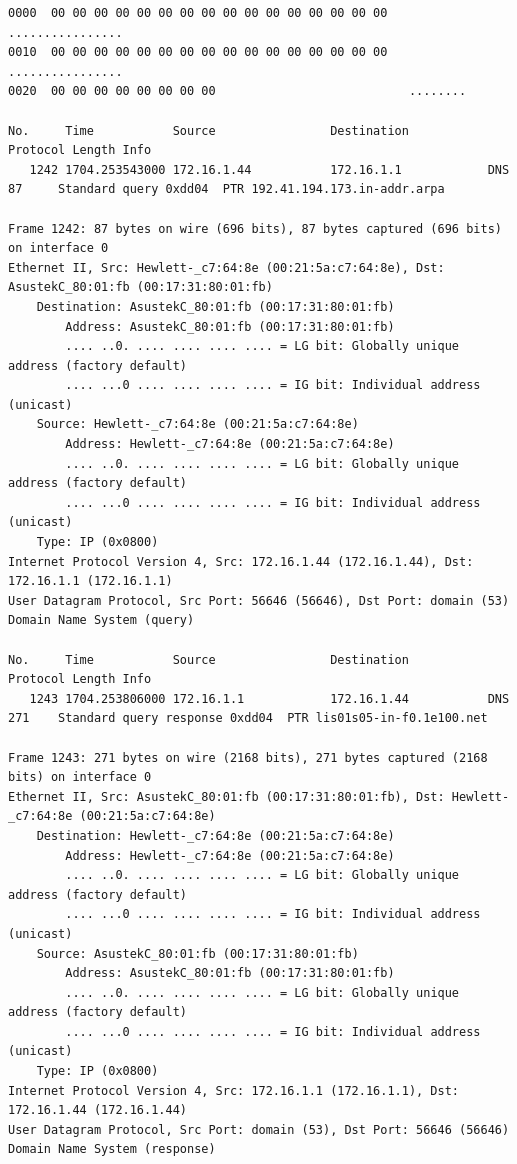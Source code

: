 \documentclass[a4paper,11pt]{article}
\begin{document}
\begin{lstlisting}
0000  00 00 00 00 00 00 00 00 00 00 00 00 00 00 00 00   ................
0010  00 00 00 00 00 00 00 00 00 00 00 00 00 00 00 00   ................
0020  00 00 00 00 00 00 00 00                           ........

No.     Time           Source                Destination           Protocol Length Info
   1242 1704.253543000 172.16.1.44           172.16.1.1            DNS      87     Standard query 0xdd04  PTR 192.41.194.173.in-addr.arpa

Frame 1242: 87 bytes on wire (696 bits), 87 bytes captured (696 bits) on interface 0
Ethernet II, Src: Hewlett-_c7:64:8e (00:21:5a:c7:64:8e), Dst: AsustekC_80:01:fb (00:17:31:80:01:fb)
    Destination: AsustekC_80:01:fb (00:17:31:80:01:fb)
        Address: AsustekC_80:01:fb (00:17:31:80:01:fb)
        .... ..0. .... .... .... .... = LG bit: Globally unique address (factory default)
        .... ...0 .... .... .... .... = IG bit: Individual address (unicast)
    Source: Hewlett-_c7:64:8e (00:21:5a:c7:64:8e)
        Address: Hewlett-_c7:64:8e (00:21:5a:c7:64:8e)
        .... ..0. .... .... .... .... = LG bit: Globally unique address (factory default)
        .... ...0 .... .... .... .... = IG bit: Individual address (unicast)
    Type: IP (0x0800)
Internet Protocol Version 4, Src: 172.16.1.44 (172.16.1.44), Dst: 172.16.1.1 (172.16.1.1)
User Datagram Protocol, Src Port: 56646 (56646), Dst Port: domain (53)
Domain Name System (query)

No.     Time           Source                Destination           Protocol Length Info
   1243 1704.253806000 172.16.1.1            172.16.1.44           DNS      271    Standard query response 0xdd04  PTR lis01s05-in-f0.1e100.net

Frame 1243: 271 bytes on wire (2168 bits), 271 bytes captured (2168 bits) on interface 0
Ethernet II, Src: AsustekC_80:01:fb (00:17:31:80:01:fb), Dst: Hewlett-_c7:64:8e (00:21:5a:c7:64:8e)
    Destination: Hewlett-_c7:64:8e (00:21:5a:c7:64:8e)
        Address: Hewlett-_c7:64:8e (00:21:5a:c7:64:8e)
        .... ..0. .... .... .... .... = LG bit: Globally unique address (factory default)
        .... ...0 .... .... .... .... = IG bit: Individual address (unicast)
    Source: AsustekC_80:01:fb (00:17:31:80:01:fb)
        Address: AsustekC_80:01:fb (00:17:31:80:01:fb)
        .... ..0. .... .... .... .... = LG bit: Globally unique address (factory default)
        .... ...0 .... .... .... .... = IG bit: Individual address (unicast)
    Type: IP (0x0800)
Internet Protocol Version 4, Src: 172.16.1.1 (172.16.1.1), Dst: 172.16.1.44 (172.16.1.44)
User Datagram Protocol, Src Port: domain (53), Dst Port: 56646 (56646)
Domain Name System (response)


\end{lstlisting}
\end{document}
